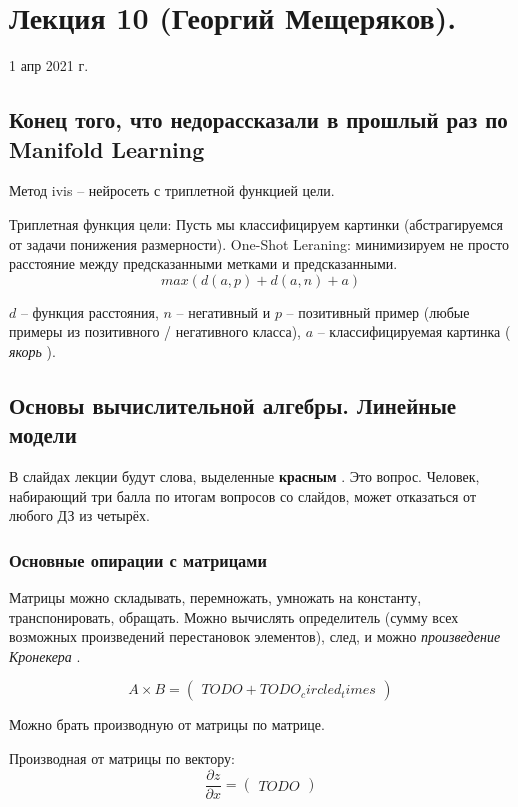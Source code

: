 \documentclass[main.tex]{subfiles}
\begin{document}
	
\section{ Лекция 10 (Георгий Мещеряков).  }

1 апр 2021 г.

\subsection{ Конец того, что недорассказали в прошлый раз по Manifold Learning }

Метод ivis -- нейросеть с триплетной функцией цели.

Триплетная функция цели:
Пусть мы классифицируем картинки (абстрагируемся от задачи понижения размерности).
One-Shot Leraning: минимизируем не просто расстояние между предсказанными метками и предсказанными.
\[ max( d(a,p) + d(a, n) + a) \]

$ d $ -- функция расстояния, $ n $ -- негативный и $ p $ -- позитивный пример (любые примеры из позитивного / негативного класса), $ a $ -- классифицируемая картинка (\emph{ якорь }).

\subsection{ Основы вычислительной алгебры. Линейные модели }

В слайдах лекции будут слова, выделенные \textbf{ красным }.
Это вопрос.
Человек, набирающий три балла по итогам вопросов со слайдов, может отказаться от любого ДЗ из четырёх.

\subsubsection{ Основные опирации с матрицами }

Матрицы можно складывать, перемножать, умножать на константу, транспонировать, обращать.
Можно вычислять определитель (сумму всех возможных произведений перестановок элементов), след, и можно \emph{ произведение Кронекера }.

\[ A \times B = \begin{pmatrix}
TODO + TODO_circled_times
\end{pmatrix} \]

Можно брать производную от матрицы по матрице.

Производная от матрицы по вектору:
$$ \frac{\partial z}{\partial x} = \begin{pmatrix}
TODO
\end{pmatrix} $$
\end{document}
